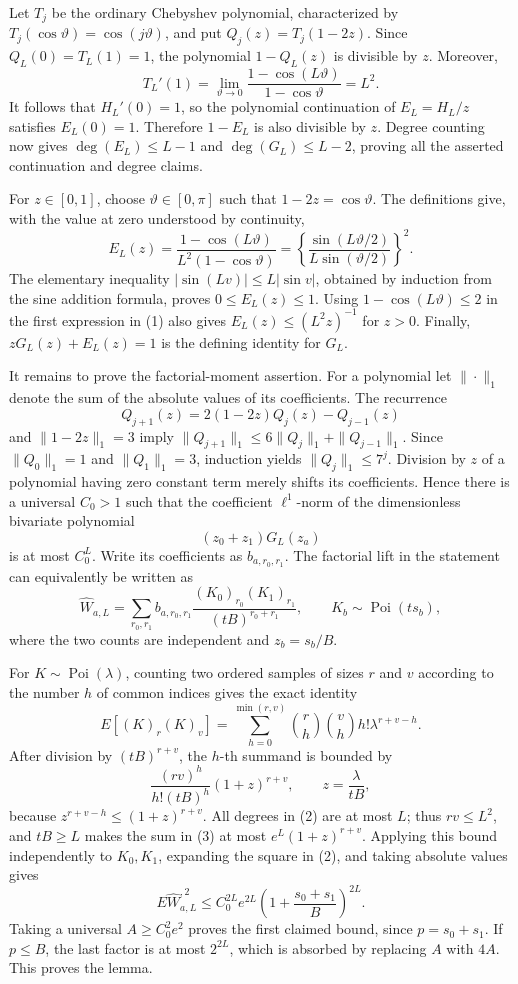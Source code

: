 Let \(T_j\) be the ordinary Chebyshev polynomial, characterized by
\(T_j(\cos \vartheta)=\cos(j\vartheta)\), and put
\(Q_j(z)=T_j(1-2z)\).  Since \(Q_L(0)=T_L(1)=1\), the polynomial
\(1-Q_L(z)\) is divisible by \(z\).  Moreover,
\[
 T_L'(1)=\lim_{\vartheta\to0}
 \frac{1-\cos(L\vartheta)}{1-\cos\vartheta}=L^2.
\]
It follows that \(H_L'(0)=1\), so the polynomial continuation of
\(E_L=H_L/z\) satisfies \(E_L(0)=1\).  Therefore \(1-E_L\) is also
divisible by \(z\).  Degree counting now gives
\(\deg(E_L)\le L-1\) and \(\deg(G_L)\le L-2\), proving all the asserted
continuation and degree claims.

For \(z\in[0,1]\), choose \(\vartheta\in[0,\pi]\) such that
\(1-2z=\cos\vartheta\).  The definitions give, with the value at zero
understood by continuity,
\[
 E_L(z)=\frac{1-\cos(L\vartheta)}{L^2(1-\cos\vartheta)}
 =\left\{\frac{\sin(L\vartheta/2)}{L\sin(\vartheta/2)}\right\}^{\!2}.
 \tag{1}
\]
The elementary inequality \(|\sin(Lv)|\le L|\sin v|\), obtained by
induction from the sine addition formula, proves \(0\le E_L(z)\le1\).
Using \(1-\cos(L\vartheta)\le2\) in the first expression in (1) also
gives \(E_L(z)\le (L^2z)^{-1}\) for \(z>0\).  Finally,
\(zG_L(z)+E_L(z)=1\) is the defining identity for \(G_L\).

It remains to prove the factorial-moment assertion.  For a polynomial
let \(\|\cdot\|_1\) denote the sum of the absolute values of its
coefficients.  The recurrence
\[
 Q_{j+1}(z)=2(1-2z)Q_j(z)-Q_{j-1}(z)
\]
and \(\|1-2z\|_1=3\) imply
\(\|Q_{j+1}\|_1\le6\|Q_j\|_1+\|Q_{j-1}\|_1\).  Since
\(\|Q_0\|_1=1\) and \(\|Q_1\|_1=3\), induction yields
\(\|Q_j\|_1\le7^j\).  Division by \(z\) of a polynomial having zero
constant term merely shifts its coefficients.  Hence there is a
universal \(C_0>1\) such that the coefficient \(\ell^1\)-norm of the
dimensionless bivariate polynomial
\[
 (z_0+z_1)G_L(z_a)
\]
is at most \(C_0^L\).  Write its coefficients as \(b_{a,r_0,r_1}\).
The factorial lift in the statement can equivalently be written as
\[
 \widehat W_{a,L}=
 \sum_{r_0,r_1}b_{a,r_0,r_1}
 \frac{(K_0)_{r_0}(K_1)_{r_1}}{(tB)^{r_0+r_1}},
 \qquad K_b\sim\operatorname{Poi}(ts_b),
 \tag{2}
\]
where the two counts are independent and \(z_b=s_b/B\).

For \(K\sim\operatorname{Poi}(\lambda)\), counting two ordered samples
of sizes \(r\) and \(v\) according to the number \(h\) of common
indices gives the exact identity
\[
 E[(K)_r(K)_v]
 =\sum_{h=0}^{\min(r,v)}\binom rh\binom vh h!\lambda^{r+v-h}.
 \tag{3}
\]
After division by \((tB)^{r+v}\), the \(h\)-th summand is bounded by
\[
 \frac{(rv)^h}{h!(tB)^h}(1+z)^{r+v},
 \qquad z=\frac{\lambda}{tB},
\]
because \(z^{r+v-h}\le(1+z)^{r+v}\).  All degrees in (2) are at most
\(L\); thus \(rv\le L^2\), and \(tB\ge L\) makes the sum in (3) at
most \(e^L(1+z)^{r+v}\).  Applying this bound independently to
\(K_0,K_1\), expanding the square in (2), and taking absolute values
gives
\[
 E\widehat W_{a,L}^{,2}
 \le C_0^{2L}e^{2L}
 \left(1+\frac{s_0+s_1}{B}\right)^{2L}.
\]
Taking a universal \(A\ge C_0^2e^2\) proves the first claimed bound,
since \(p=s_0+s_1\).  If \(p\le B\), the last factor is at most
\(2^{2L}\), which is absorbed by replacing \(A\) with \(4A\).  This
proves the lemma.

